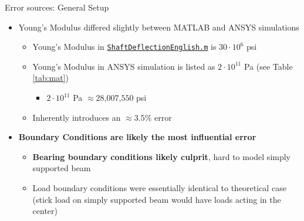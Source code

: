 \documentclass[11pt]{beamer}
\begin{document}
    \begin{frame}{Error sources: General Setup}
        \begin{itemize}
            \item Young's Modulus differed slightly between MATLAB and ANSYS simulations 
                \begin{itemize} 
                    \item Young's Modulus in \href{https://canvas.gonzaga.edu/courses/18311/files/folder/Additional\%20Content?preview=4057043}{\texttt{ShaftDeflectionEnglish.m}} is $30\cdot 10^{6}$ psi
                    \item Young's Modulus in ANSYS simulation is listed as $2\cdot10^{11}$ Pa (see Table \autoref{tab:mat})
                        \begin{itemize}
                            \item $2\cdot10^{11}$ Pa $\approx 28\textrm{,}007\textrm{,}550$ psi
                        \end{itemize}
                    \item Inherently introduces an $\approx 3.5$\% error
                \end{itemize}
            \item \textbf{Boundary Conditions are likely the most influential error}
                \begin{itemize} 
                    \item \textbf{Bearing boundary conditions likely culprit}, hard to model simply supported beam
                    \item Load boundary conditions were essentially identical to theoretical case (stick load on simply supported beam would have loads acting in the center)
                \end{itemize}
        \end{itemize}
    \end{frame}
\end{document}
